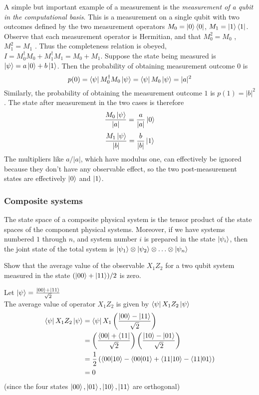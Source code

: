 A simple but important example of a measurement is the \textit{measurement of a qubit in the computational basis}. This is a measurement on a single qubit with two outcomes defined by the two measurement operators $M_0 = \ket{0}\bra{0}$, $M_1 = \ket{1}\bra{1}$. Observe that each measurement operator is Hermitian, and that $M_0^2 = M_0$ , $M_1^2 = M_1$ . Thus the completeness relation is obeyed, $I = M_0^\dag M_0 + M_1^\dag M_1 = M_0 + M_1$. Suppose the state being measured is $\ket{\psi} = a\ket{0} + b\ket{1}$. Then the probability of obtaining measurement outcome $0$ is
    $$p(0) = \bra{\psi}M_0^\dag M_0\ket{\psi} = \bra{\psi}M_0\ket{\psi} = |a|^2$$
Similarly, the probability of obtaining the measurement outcome $1$ is $p(1) = |b|^2$. The
state after measurement in the two cases is therefore
    $$\frac{M_0\ket{\psi}}{|a|} = \frac{a}{|a|}\ket{0}$$
    $$\frac{M_1\ket{\psi}}{|b|} = \frac{b}{|b|}\ket{1}$$
The multipliers like $a/|a|$, which have modulus one, can effectively be ignored because they don't have any observable effect, so the two post-measurement states are effectively $\ket{0}$ and $\ket{1}$.

\subsubsection{Composite systems}
\begin{postulate}
    The state space of a composite physical system is the tensor product of the state spaces of the component physical systems. Moreover, if we have systems numbered $1$ through $n$, and system number $i$ is prepared in the state $\ket{\psi_i}$, then the joint state of the total system is $\ket{\psi_1}\otimes\ket{\psi_2}\otimes\ldots\otimes\ket{\psi_n}$
\end{postulate}

\begin{exercise}
    Show that the average value of the observable $X_1Z_2$ for a two qubit system measured in the state $(\ket{00} + \ket{11})/2$ is zero.
\end{exercise}
\begin{solution}
    Let $\ket{\psi} = \frac{\ket{00} + \ket{11}}{\sqrt{2}}$
    \\The average value of operator $X_1Z_2$ is given by $\bra{\psi}X_1Z_2\ket{\psi}$
    \begin{equation*}
    \begin{split}
        \bra{\psi}X_1Z_2\ket{\psi} & = \bra{\psi}X_1\left(\frac{\ket{00} - \ket{11}}{\sqrt{2}}\right) \\
        & = \left(\frac{\bra{00} + \bra{11}}{\sqrt{2}}\right)\left(\frac{\ket{10} - \ket{01}}{\sqrt{2}}\right) \\
        & = \frac{1}{2}\left(\braket{00}{10} - \braket{00}{01} + \braket{11}{10} - \braket{11}{01}\right) \\
        & = 0
    \end{split}
    \end{equation*}
    (since the four states $\ket{00}, \ket{01}, \ket{10}, \ket{11}$ are orthogonal)
\end{solution}
\vspace{1em}

